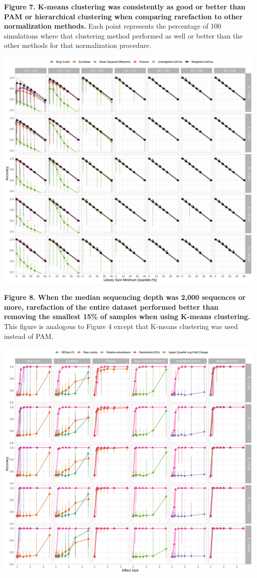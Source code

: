 \documentclass[
]{article}
\begin{document}
\textbf{Figure 7. K-means clustering was consistently as good or better
than PAM or hierarchical clustering when comparing rarefaction to other
normalization methods.} Each point represents the percentage of 100
simulations where that clustering method performed as well or better
than the other methods for that normalization procedure.

\newpage

\includegraphics{figure_08.png}

\textbf{Figure 8. When the median sequencing depth was 2,000 sequences
or more, rarefaction of the entire dataset performed better than
removing the smallest 15\% of samples when using K-means clustering.}
This figure is analogous to Figure 4 except that K-means clustering was
used instead of PAM.

\newpage

\includegraphics{figure_09.png}
\end{document}
